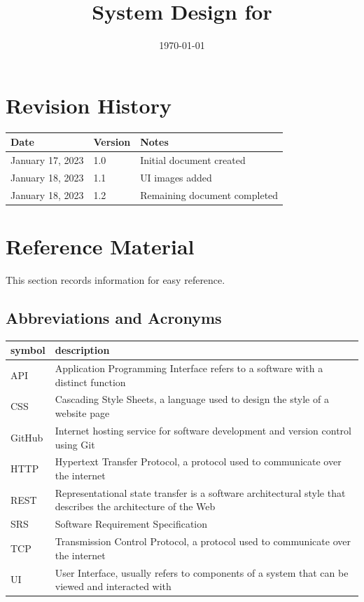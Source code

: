 \documentclass[12pt, titlepage]{article}
\begin{document}
	
	\title{System Design for \progname{}} 
	\author{\authname}
	\date{\today}
	
	\maketitle
	
	
	\section{Revision History}
	
	\begin{tabularx}{\textwidth}{p{3cm}p{2cm}X}
		\toprule {\bf Date} & {\bf Version} & {\bf Notes}\\
		\midrule
		January 17, 2023 & 1.0 & Initial document created\\
		January 18, 2023 & 1.1 & UI images added\\
		January 18, 2023 & 1.2 & Remaining document completed\\
		\bottomrule
	\end{tabularx}
	
	\newpage
	
	\section{Reference Material}
	
	This section records information for easy reference.
	
	\subsection{Abbreviations and Acronyms}
	
	\renewcommand{\arraystretch}{1.2}
	\begin{table}[H]
		\small
		\centering
		\begin{tabular}{l p{15cm}} 
			\toprule		
			\textbf{symbol} & \textbf{description}\\
			\midrule
			API & Application Programming Interface refers to a software with a distinct function\\
			CSS & Cascading Style Sheets, a language used to design the style of a website page\\
			GitHub & Internet hosting service for software development and version control using Git\\
			HTTP & Hypertext Transfer Protocol, a protocol used to communicate over the internet\\
			REST & Representational state transfer is a software architectural style that describes the architecture of the Web\\
			SRS & Software Requirement Specification\\
			TCP & Transmission Control Protocol, a protocol used to communicate over the internet\\
			UI & User Interface, usually refers to components of a system that can be viewed and interacted with\\
			\bottomrule
		\end{tabular}
	\end{table}
	
\end{document}
